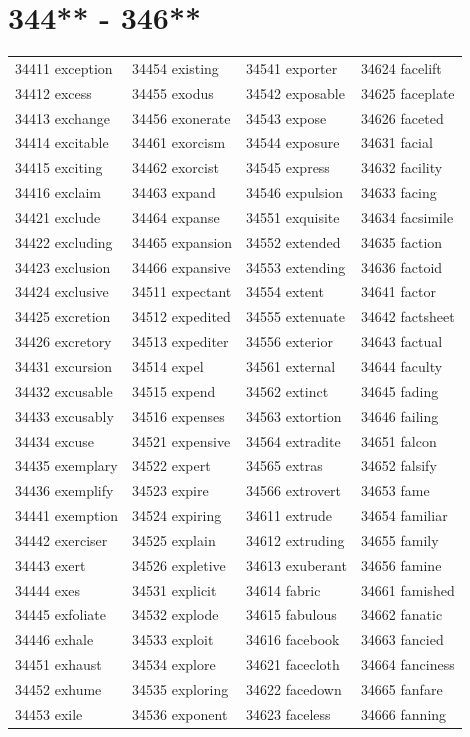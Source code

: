 \documentclass[10pt, oneside]{book}
\begin{document}
\begin{table}
	\centering
	\section*{344** - 346**}
	\begin{tabular}{l l l l}
34411 exception &34454 existing &34541 exporter &34624 facelift\\
34412 excess &34455 exodus &34542 exposable &34625 faceplate\\
34413 exchange &34456 exonerate &34543 expose &34626 faceted\\
34414 excitable &34461 exorcism &34544 exposure &34631 facial\\
34415 exciting &34462 exorcist &34545 express &34632 facility\\
34416 exclaim &34463 expand &34546 expulsion &34633 facing\\
34421 exclude &34464 expanse &34551 exquisite &34634 facsimile\\
34422 excluding &34465 expansion &34552 extended &34635 faction\\
34423 exclusion &34466 expansive &34553 extending &34636 factoid\\
34424 exclusive &34511 expectant &34554 extent &34641 factor\\
34425 excretion &34512 expedited &34555 extenuate &34642 factsheet\\
34426 excretory &34513 expediter &34556 exterior &34643 factual\\
34431 excursion &34514 expel &34561 external &34644 faculty\\
34432 excusable &34515 expend &34562 extinct &34645 fading\\
34433 excusably &34516 expenses &34563 extortion &34646 failing\\
34434 excuse &34521 expensive &34564 extradite &34651 falcon\\
34435 exemplary &34522 expert &34565 extras &34652 falsify\\
34436 exemplify &34523 expire &34566 extrovert &34653 fame\\
34441 exemption &34524 expiring &34611 extrude &34654 familiar\\
34442 exerciser &34525 explain &34612 extruding &34655 family\\
34443 exert &34526 expletive &34613 exuberant &34656 famine\\
34444 exes &34531 explicit &34614 fabric &34661 famished\\
34445 exfoliate &34532 explode &34615 fabulous &34662 fanatic\\
34446 exhale &34533 exploit &34616 facebook &34663 fancied\\
34451 exhaust &34534 explore &34621 facecloth &34664 fanciness\\
34452 exhume &34535 exploring &34622 facedown &34665 fanfare\\
34453 exile &34536 exponent &34623 faceless &34666 fanning\\
	\end{tabular}
 \end{table}
\clearpage
\end{document}
